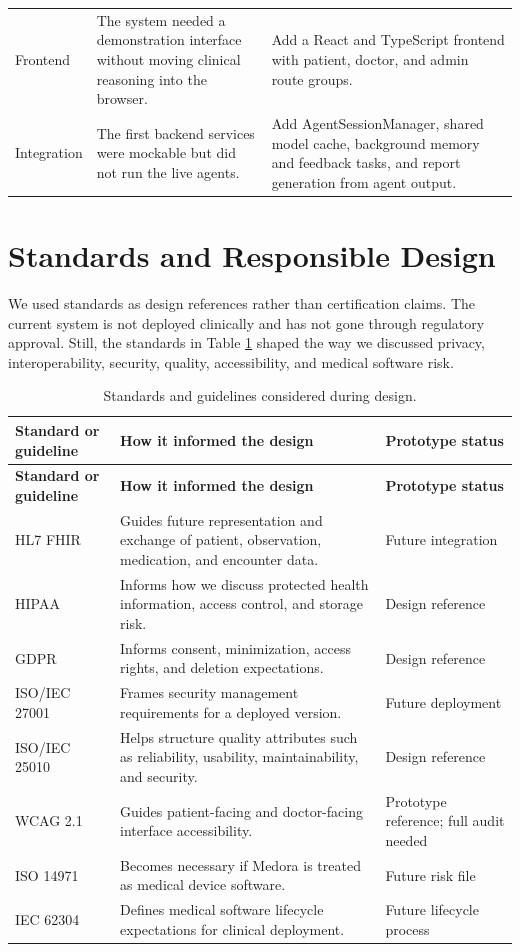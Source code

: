 \begin{longtable}{p{} p{} p{}}
Frontend & The system needed a demonstration interface without moving clinical reasoning into the browser. & Add a React and TypeScript frontend with patient, doctor, and admin route groups.\\
Integration & The first backend services were mockable but did not run the live agents. & Add AgentSessionManager, shared model cache, background memory and feedback tasks, and report generation from agent output.\\
\bottomrule
\end{longtable}

\section{Standards and Responsible Design}

We used standards as design references rather than certification claims. The current system is not deployed clinically and has not gone through regulatory approval. Still, the standards in Table \ref{tab:standards} shaped the way we discussed privacy, interoperability, security, quality, accessibility, and medical software risk.

\begin{longtable}{p{} p{} p{}}
\caption{Standards and guidelines considered during design.}
\label{tab:standards}\\
\toprule
\textbf{Standard or guideline} & \textbf{How it informed the design} & \textbf{Prototype status}\\
\midrule
\endfirsthead
\toprule
\textbf{Standard or guideline} & \textbf{How it informed the design} & \textbf{Prototype status}\\
\midrule
\endhead
HL7 FHIR \cite{hl7fhir} & Guides future representation and exchange of patient, observation, medication, and encounter data. & Future integration\\
HIPAA \cite{hipaa} & Informs how we discuss protected health information, access control, and storage risk. & Design reference\\
GDPR \cite{gdpr} & Informs consent, minimization, access rights, and deletion expectations. & Design reference\\
ISO/IEC 27001 \cite{iso27001} & Frames security management requirements for a deployed version. & Future deployment\\
ISO/IEC 25010 \cite{iso25010} & Helps structure quality attributes such as reliability, usability, maintainability, and security. & Design reference\\
WCAG 2.1 \cite{wcag21} & Guides patient-facing and doctor-facing interface accessibility. & Prototype reference; full audit needed\\
ISO 14971 \cite{iso14971} & Becomes necessary if Medora is treated as medical device software. & Future risk file\\
IEC 62304 \cite{iec62304} & Defines medical software lifecycle expectations for clinical deployment. & Future lifecycle process\\
\bottomrule
\end{longtable}

